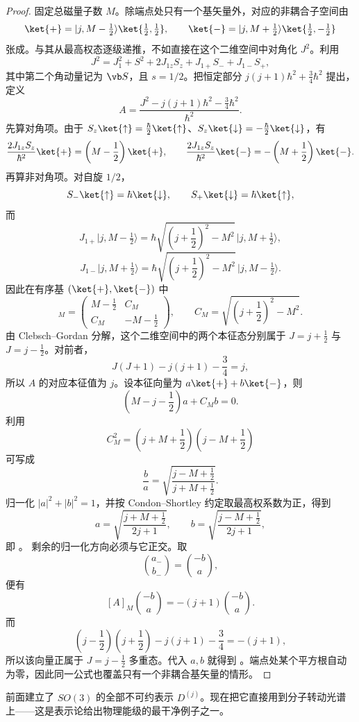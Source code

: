\begin{proof}
固定总磁量子数 $M$。除端点处只有一个基矢量外，对应的非耦合子空间由
\[
\ket{+}
=\lvert j,M-\tfrac12\rangle\ket{\tfrac12,\tfrac12},
\qquad
\ket{-}
=\lvert j,M+\tfrac12\rangle\ket{\tfrac12,-\tfrac12}
\]
张成。与其从最高权态逐级递推，不如直接在这个二维空间中对角化 $J^2$。利用
\[
J^2=J_1^2+S^2+2J_{1z}S_z+J_{1+}S_-+J_{1-}S_+,
\]
其中第二个角动量记为 $\vb S$，且 $s=1/2$。把恒定部分 $j(j+1)\hbar^2+\frac34\hbar^2$ 提出，定义
\[
A=\frac{J^2-j(j+1)\hbar^2-\frac34\hbar^2}{\hbar^2}.
\]
先算对角项。由于 $S_z\ket{\uparrow}=\frac\hbar2\ket{\uparrow}$、$S_z\ket{\downarrow}=-\frac\hbar2\ket{\downarrow}$，有
\[
\frac{2J_{1z}S_z}{\hbar^2}\ket{+}
=\left(M-\frac12\right)\ket{+},
\qquad
\frac{2J_{1z}S_z}{\hbar^2}\ket{-}
=-\left(M+\frac12\right)\ket{-}.
\]
再算非对角项。对自旋 $1/2$，
\[
S_-\ket{\uparrow}=\hbar\ket{\downarrow},
\qquad
S_+\ket{\downarrow}=\hbar\ket{\uparrow},
\]
而
\[
J_{1+}\lvert j,M-\tfrac12\rangle
=\hbar\sqrt{\left(j+\frac12\right)^2-M^2}\,
\lvert j,M+\tfrac12\rangle,
\]
\[
J_{1-}\lvert j,M+\tfrac12\rangle
=\hbar\sqrt{\left(j+\frac12\right)^2-M^2}\,
\lvert j,M-\tfrac12\rangle.
\]
因此在有序基 $(\ket{+},\ket{-})$ 中
\begin{equation}
[A]_M=
\begin{pmatrix}
M-\frac12 & C_M\\
C_M & -M-\frac12
\end{pmatrix},
\qquad
C_M=\sqrt{\left(j+\frac12\right)^2-M^2}.
\label{eq:j-half-two-by-two}
\end{equation}
由 Clebsch--Gordan 分解，这个二维空间中的两个本征态分别属于 $J=j+\frac12$ 与 $J=j-\frac12$。对前者，
\[
J(J+1)-j(j+1)-\frac34=j,
\]
所以 $A$ 的对应本征值为 $j$。设本征向量为 $a\ket{+}+b\ket{-}$，则
\[
\left(M-j-\frac12\right)a+C_M b=0.
\]
利用
\[
C_M^2
=\left(j+M+\frac12\right)\left(j-M+\frac12\right)
\]
可写成
\[
\frac{b}{a}
=\sqrt{\frac{j-M+\frac12}{j+M+\frac12}}.
\]
归一化 $|a|^2+|b|^2=1$，并按 Condon--Shortley 约定取最高权系数为正，得到
\[
a=\sqrt{\frac{j+M+\frac12}{2j+1}},
\qquad
b=\sqrt{\frac{j-M+\frac12}{2j+1}},
\]
即 。
剩余的归一化方向必须与它正交。取
\[
\binom{a_-}{b_-}
=
\binom{-b}{a},
\]
便有
\[
[A]_M\binom{-b}{a}=-(j+1)\binom{-b}{a}.
\]
而
\[
\left(j-\frac12\right)\left(j+\frac12\right)
-j(j+1)-\frac34=-(j+1),
\]
所以该向量正属于 $J=j-\frac12$ 多重态。代入 $a,b$ 就得到 。端点处某个平方根自动为零，因此同一公式也覆盖只有一个非耦合基矢量的情形。
\end{proof}
前面建立了 $SO(3)$ 的全部不可约表示 $D^{(j)}$。现在把它直接用到分子转动光谱上——这是表示论给出物理能级的最干净例子之一。
